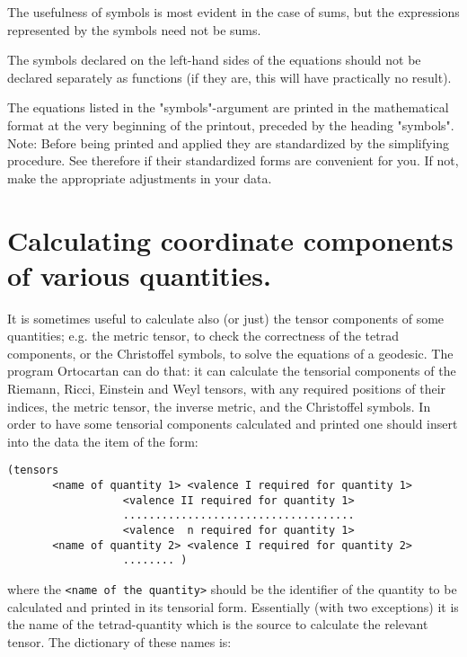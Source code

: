 The usefulness of symbols is most evident in  the  case of sums, but the
expressions represented by the symbols need not be sums.

The symbols declared on  the  left-hand  sides  of  the
     equations should not be declared separately as functions (if
     they are, this will have practically no result).

The equations  listed  in  the  "symbols"-argument  are printed  in the
mathematical format at the very beginning of the printout, preceded by the
heading "symbols". Note: Before being  printed and applied they are
standardized by the simplifying procedure.  See  therefore  if  their
standardized
     forms  are  convenient for you. If not, make the appropriate
     adjustments in your data.

\section{Calculating coordinate components of various quantities.}

It is sometimes useful to calculate also (or just)  the tensor  components  of
some quantities; e.g. the metric tensor, to check the correctness of the tetrad
components,  or the Christoffel  symbols,  to  solve the equations of a
geodesic. The program Ortocartan can do that: it  can  calculate
     the tensorial components of the Riemann, Ricci, Einstein and
     Weyl tensors, with any required positions of their  indices,
     the  metric  tensor, the inverse metric, and the Christoffel
symbols. In order to have some tensorial  components  calculated  and  printed
one should insert into the data the item
     of the form:

\bigskip

\begin{verbatim}
(tensors
       <name of quantity 1> <valence I required for quantity 1>
                  <valence II required for quantity 1>
                  ....................................
                  <valence  n required for quantity 1>
       <name of quantity 2> <valence I required for quantity 2>
                  ........ )
\end{verbatim}

\bigskip

\noindent where the \verb+<name of the quantity>+ should be the identifier of
the quantity to be calculated and printed in its tensorial form.
         Essentially (with two exceptions) it is the name of  the
tetrad-quantity which is the source to calculate the relevant tensor. The
dictionary of these names is:

